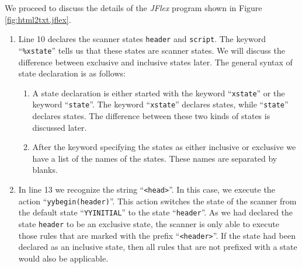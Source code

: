 We proceed to discuss the details of the \textsl{JFlex} program shown in Figure \ref{fig:html2txt.jflex}.
\begin{enumerate}
\item Line  10 declares the scanner states \texttt{header} and \texttt{script}.  The keyword ``\texttt{\%xstate}''
      tells us that these states are   scanner states.  We will discuss the difference
      between exclusive and inclusive states later.
      The general syntax of state declaration is as follows:
      \begin{enumerate}
      \item A state declaration is either started with the keyword ``\texttt{xstate}''
            or the keyword ``\texttt{state}''.  The keyword
            ``\texttt{xstate}'' declares  states, while
            ``\texttt{state}'' declares   states.  The 
            difference between these two kinds of states is discussed later.
      \item After the keyword specifying the states as either inclusive or exclusive we have a list
            of the names of the states.  These names are separated by blanks.
      \end{enumerate}
\item In line 13 we recognize the string  ``\texttt{<head>}''.  In this case, we execute the action 
      ``\texttt{yybegin(header)}''.  This action switches the state of the scanner from the default
      state ``\texttt{YYINITIAL}'' to  the state ``\texttt{header}''.   
      As we had declared the state \texttt{header} to be an  exclusive state, the scanner is only
      able to execute those rules that are marked with the prefix ``\texttt{<header>}''.
      If the state had been declared as an inclusive state, then all rules that are not prefixed
      with a state would also be applicable.  
      

\end{enumerate}
